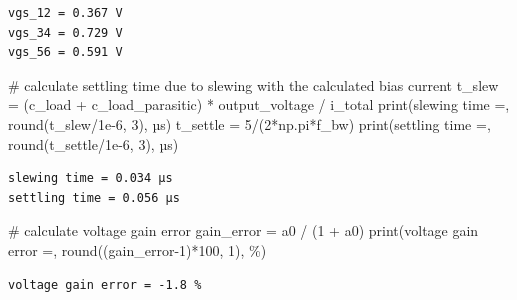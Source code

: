 \documentclass[
  a4paper,
  DIV=11,
  numbers=noendperiod]{scrartcl}
\newenvironment{Shaded}{\begin{snugshade}}{\end{snugshade}}
\newcommand{\BuiltInTok}[1]{\textcolor[rgb]{0.00,0.23,0.31}{#1}}
\newcommand{\CommentTok}[1]{\textcolor[rgb]{0.37,0.37,0.37}{#1}}
\newcommand{\DecValTok}[1]{\textcolor[rgb]{0.68,0.00,0.00}{#1}}
\newcommand{\FloatTok}[1]{\textcolor[rgb]{0.68,0.00,0.00}{#1}}
\newcommand{\NormalTok}[1]{\textcolor[rgb]{0.00,0.23,0.31}{#1}}
\newcommand{\OperatorTok}[1]{\textcolor[rgb]{0.37,0.37,0.37}{#1}}
\newcommand{\StringTok}[1]{\textcolor[rgb]{0.13,0.47,0.30}{#1}}
\begin{document}
\begin{tcolorbox}
\begin{verbatim}
vgs_12 = 0.367 V
vgs_34 = 0.729 V
vgs_56 = 0.591 V
\end{verbatim}

\begin{Shaded}
\begin{Highlighting}[]
\CommentTok{\# calculate settling time due to slewing with the calculated bias current}
\NormalTok{t\_slew }\OperatorTok{=}\NormalTok{ (c\_load }\OperatorTok{+}\NormalTok{ c\_load\_parasitic) }\OperatorTok{*}\NormalTok{ output\_voltage }\OperatorTok{/}\NormalTok{ i\_total}
\BuiltInTok{print}\NormalTok{(}\StringTok{\textquotesingle{}slewing time =\textquotesingle{}}\NormalTok{, }\BuiltInTok{round}\NormalTok{(t\_slew}\OperatorTok{/}\FloatTok{1e{-}6}\NormalTok{, }\DecValTok{3}\NormalTok{), }\StringTok{\textquotesingle{}µs\textquotesingle{}}\NormalTok{)}
\NormalTok{t\_settle }\OperatorTok{=} \DecValTok{5}\OperatorTok{/}\NormalTok{(}\DecValTok{2}\OperatorTok{*}\NormalTok{np.pi}\OperatorTok{*}\NormalTok{f\_bw)}
\BuiltInTok{print}\NormalTok{(}\StringTok{\textquotesingle{}settling time =\textquotesingle{}}\NormalTok{, }\BuiltInTok{round}\NormalTok{(t\_settle}\OperatorTok{/}\FloatTok{1e{-}6}\NormalTok{, }\DecValTok{3}\NormalTok{), }\StringTok{\textquotesingle{}µs\textquotesingle{}}\NormalTok{)}
\end{Highlighting}
\end{Shaded}

\begin{verbatim}
slewing time = 0.034 µs
settling time = 0.056 µs
\end{verbatim}

\begin{Shaded}
\begin{Highlighting}[]
\CommentTok{\# calculate voltage gain error}
\NormalTok{gain\_error }\OperatorTok{=}\NormalTok{ a0 }\OperatorTok{/}\NormalTok{ (}\DecValTok{1} \OperatorTok{+}\NormalTok{ a0)}
\BuiltInTok{print}\NormalTok{(}\StringTok{\textquotesingle{}voltage gain error =\textquotesingle{}}\NormalTok{, }\BuiltInTok{round}\NormalTok{((gain\_error}\OperatorTok{{-}}\DecValTok{1}\NormalTok{)}\OperatorTok{*}\DecValTok{100}\NormalTok{, }\DecValTok{1}\NormalTok{), }\StringTok{\textquotesingle{}\%\textquotesingle{}}\NormalTok{)}
\end{Highlighting}
\end{Shaded}

\begin{verbatim}
voltage gain error = -1.8 %
\end{verbatim}


\end{tcolorbox}
\end{document}
